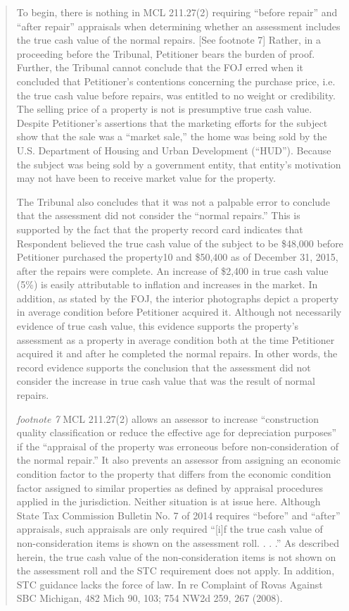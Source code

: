 \documentclass[12pt,\documentclassflag]{michiganCourtOfAppealsBrief}
\begin{document}
\begin{quotation}
To begin, there is nothing in MCL 211.27(2) requiring “before repair” and “after repair” appraisals when determining whether an assessment includes the true cash value of the normal repairs. [See footnote 7] Rather, in a proceeding before the Tribunal, Petitioner bears the burden of proof. Further, the Tribunal cannot conclude that the FOJ erred when it concluded that Petitioner’s contentions concerning the purchase price, i.e. the true cash value before repairs, was entitled to no weight or credibility. The selling price of a property is not is presumptive true cash value. Despite Petitioner’s assertions that the marketing efforts for the subject show that the sale was a “market sale,” the home was being sold by the U.S. Department of Housing and Urban Development (“HUD”). Because the subject was being sold by a government entity, that entity’s motivation may not have been to receive market value for the property.

The Tribunal also concludes that it was not a palpable error to conclude that the assessment did not consider the “normal repairs.” This is supported by the fact that the property record card indicates that Respondent believed the true cash value of the subject to be \$48,000 before Petitioner purchased the property10 and \$50,400 as of December 31, 2015, after the repairs were complete. An increase of \$2,400 in true cash value (5\%) is easily attributable to inflation and increases in the market. In addition, as stated by the FOJ, the interior photographs depict a property in average condition before Petitioner acquired it. Although not necessarily evidence of true cash value, this evidence supports the property’s assessment as a property in average condition both at the time Petitioner acquired it and after he completed the normal repairs. In other words, the record evidence supports the conclusion that the assessment did not consider the increase in true cash value that was the result of normal repairs.

\textit{footnote 7} MCL 211.27(2) allows an assessor to increase “construction quality classification or reduce the effective age for depreciation purposes” if the “appraisal of the property was erroneous before non-consideration of the normal repair.” It also prevents an assessor from assigning an economic condition factor to the property that differs from the economic condition factor assigned to similar properties as defined by appraisal procedures applied in the jurisdiction. Neither situation is at issue here. Although State Tax Commission Bulletin No. 7 of 2014 requires “before” and “after” appraisals, such appraisals are only required “[i]f the true cash value of non-consideration items is shown on the assessment roll. . . .” As described herein, the true cash value of the non-consideration items is not shown on the assessment roll and the STC requirement does not apply. In addition, STC guidance lacks the force of law. In re Complaint of Rovas Against SBC Michigan, 482 Mich 90, 103; 754 NW2d 259, 267 (2008).

\end{quotation}
\end{document}

